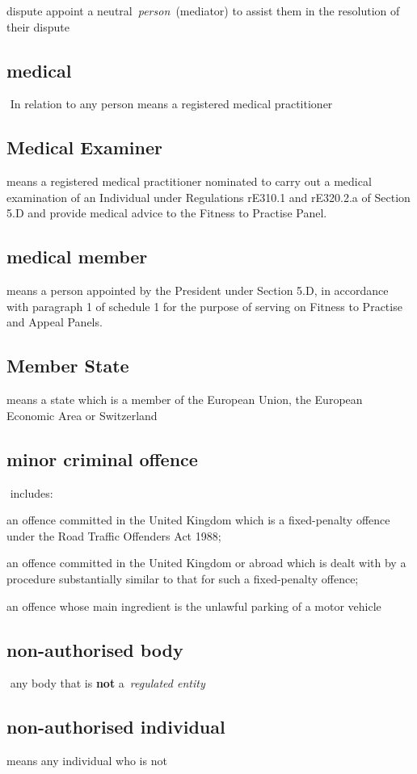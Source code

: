   dispute appoint a neutral~\emph{person~}(mediator) to assist them in
  the resolution of their dispute  \subsection{medical } In relation to any person means a registered
  medical practitioner  \subsection{Medical Examiner } means a registered medical practitioner
  nominated to carry out a medical examination of an Individual under
  Regulations rE310.1 and rE320.2.a of Section 5.D and provide medical
  advice to the Fitness to Practise Panel.  \subsection{medical member } means a person appointed by the President
  under Section 5.D, in accordance with paragraph 1 of schedule 1 for
  the purpose of serving on Fitness to Practise and Appeal Panels.  \subsection{Member State } means a state which is a member of the
  European Union, the European Economic Area or Switzerland  \subsection{minor criminal offence } includes: \al \item an offence committed in
  the United Kingdom which is a fixed-penalty offence under the Road
  Traffic Offenders Act 1988; \item an offence committed in the United
  Kingdom or abroad which is dealt with by a procedure substantially
  similar to that for such a fixed-penalty offence; \item an offence whose
  main ingredient is the unlawful parking of a motor vehicle\la 
    \subsection{non-authorised body } any body that is \textbf{not} a~\emph{regulated
  entity} \subsection{non-authorised individual } means any individual who is not
